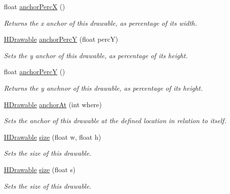 \begin{DoxyCompactItemize}
float \hyperlink{classhype_1_1core_1_1drawable_1_1_h_drawable_a61972696a8beb2118f118de9cbab90aa}{anchor\-Perc\-X} ()
\begin{DoxyCompactList}\small\item\em Returns the x anchor of this drawable, as percentage of its width. \end{DoxyCompactList}\item 
\hyperlink{classhype_1_1core_1_1drawable_1_1_h_drawable}{H\-Drawable} \hyperlink{classhype_1_1core_1_1drawable_1_1_h_drawable_a39eeab51f73f45544942e50aa5c2c944}{anchor\-Perc\-Y} (float perc\-Y)
\begin{DoxyCompactList}\small\item\em Sets the y anchor of this drawable, as percentage of its height. \end{DoxyCompactList}\item 
float \hyperlink{classhype_1_1core_1_1drawable_1_1_h_drawable_aa533e99dd9d51a2c7c0dfbe9aa333fda}{anchor\-Perc\-Y} ()
\begin{DoxyCompactList}\small\item\em Returns the y anchnor of this drawable, as percentage of its height. \end{DoxyCompactList}\item 
\hyperlink{classhype_1_1core_1_1drawable_1_1_h_drawable}{H\-Drawable} \hyperlink{classhype_1_1core_1_1drawable_1_1_h_drawable_ab75ab965c009e70676767ba88016053c}{anchor\-At} (int where)
\begin{DoxyCompactList}\small\item\em Sets the anchor of this drawable at the defined location in relation to itself. \end{DoxyCompactList}\item 
\hyperlink{classhype_1_1core_1_1drawable_1_1_h_drawable}{H\-Drawable} \hyperlink{classhype_1_1core_1_1drawable_1_1_h_drawable_ae046413f91234f66dde997ef02908e24}{size} (float w, float h)
\begin{DoxyCompactList}\small\item\em Sets the size of this drawable. \end{DoxyCompactList}\item 
\hyperlink{classhype_1_1core_1_1drawable_1_1_h_drawable}{H\-Drawable} \hyperlink{classhype_1_1core_1_1drawable_1_1_h_drawable_a2c8b70fd46b03299178eb14ca57baaa4}{size} (float s)
\begin{DoxyCompactList}\small\item\em Sets the size of this drawable. \end{DoxyCompactList}\item 

\end{DoxyCompactItemize}
